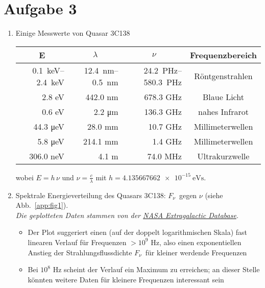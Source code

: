 \documentclass[11pt,a4paper]{scrartcl}
\newcommand{\head}[1]{\multicolumn{1}{c}{#1}}
\newcommand*{\figref}[1]{(siehe Abb.~\ref{#1})}
\newcommand{\Fnu}{\ensuremath{{F}_{\nu}}}
\begin{document}
\section*{Aufgabe 3}

\begin{enumerate}[label=\textbf{\large(\alph*)}]

\item
Einige Messwerte von Quasar 3C138

\begin{table}[h]
\centering
\begin{tabular}{rrrc}
    \toprule
    \head{E} & \head{$\lambda$} & \head{$\nu$} & \head{Frequenzbereich} \\
    \midrule
    \SIrange{0.1}{2.4}{\kilo\electronvolt} & \SIrange{12.4}{0.5}{\nano\metre} &
    \SIrange{24.2}{580.3}{\peta\hertz} & Röntgenstrahlen \\
    2.8 \si{\electronvolt} & 442.0 \si{\nano\metre} & 678.3 \si{\giga\hertz} &
    Blaue Licht \\
    0.6 \si{\electronvolt} & 2.2 \si{\micro\metre} & 136.3 \si{\giga\hertz} &
    nahes Infrarot \\
    44.3 \si{\micro\electronvolt} & 28.0 \si{\milli\metre} & 10.7 \si{\giga\hertz}
    &  Millimeterwellen \\
    5.8 \si{\micro\electronvolt} & 214.1 \si{\milli\metre} & 1.4 \si{\giga\hertz}
    & Millimeterwellen \\
    306.0 \si{\nano\electronvolt} & 4.1 \si{\metre} & 74.0 \si{\mega\hertz} &
    Ultrakurzwelle \\
    \bottomrule
\end{tabular}
\label{tab:tab1}
\end{table}

wobei $E = h\,\nu$ und $\nu = \frac{c}{\lambda}$ mit $h =
\SI{4.135667662e-15}{\electronvolt\second}$.

\vspace*{\baselineskip}

\item
Spektrale Energieverteilung des Quasars 3C138: \Fnu~gegen
$\nu$ \figref{app:fig1}. \\
\textit{\small Die geplotteten Daten stammen von der
    \href{https://ned.ipac.caltech.edu/}{NASA Extragalactic Database}.}

    \begin{itemize}
        \item Der Plot suggeriert einen (auf der doppelt logarithmischen
            Skala) fast linearen Verlauf für Frequenzen $>10^9$ \si{\hertz},
            also einen exponentiellen Anstieg der Strahlungsflussdichte
            \Fnu~für kleiner werdende Frequenzen
        \item Bei $10^8$ \si{\hertz} scheint der Verlauf ein Maximum zu
            erreichen; an dieser Stelle könnten weitere Daten für kleinere
            Frequenzen interessant sein
    \end{itemize}


\end{enumerate}
\end{document}
